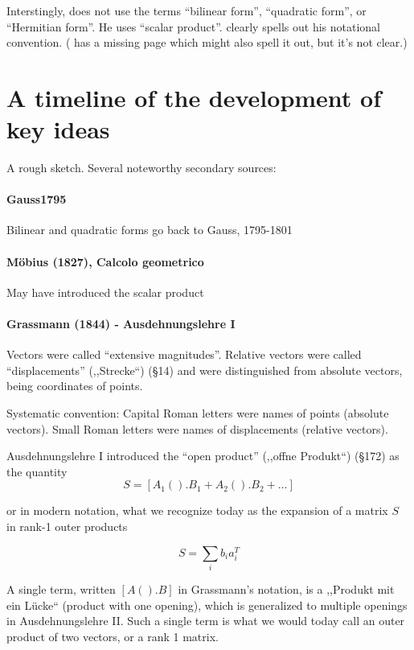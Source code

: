 Interstingly, \cite{Householder1953} does not use the terms ``bilinear form'', ``quadratic form'', or ``Hermitian form''. He uses ``scalar product''. \cite{Householder1955} clearly spells out his notational convention. (\cite{Householder1953} has a missing page which might also spell it out, but it's not clear.)



\section{A timeline of the development of key ideas}

A rough sketch.
Several noteworthy secondary sources:~\cite{Taber1890,Parshall1985,Kleiner2007,Higham2009}

\paragraph{Gauss1795}

Bilinear and quadratic forms go back to Gauss, 1795-1801

\paragraph{Möbius (1827), Calcolo geometrico}

May have introduced the scalar product

\paragraph{Grassmann (1844) - Ausdehnungslehre I~\cite{Grassmann1844,Grassmann1995}}

Vectors were called ``extensive magnitudes''. Relative vectors were called ``displacements'' (,,Strecke``) (\S 14) and were distinguished from absolute vectors, being coordinates of points.

Systematic convention: Capital Roman letters were names of points (absolute vectors). Small Roman letters were names of displacements (relative vectors).

Ausdehnungslehre I introduced the ``open product'' (,,offne Produkt``) (\S 172) as the quantity
\[
S = [A_1().B_1 + A_2().B_2 + \dots]
\]

or in modern notation, what we recognize today as the expansion of a matrix $S$ in rank-1 outer products

\[
S = \sum_i b_i a_i^T
\]

A single term, written $[A().B]$ in Grassmann's notation, is a ,,Produkt mit ein Lücke`` (product with one opening), which is generalized to multiple openings in Ausdehnungslehre II. Such a single term is what we would today call an outer product of two vectors, or a rank 1 matrix.

